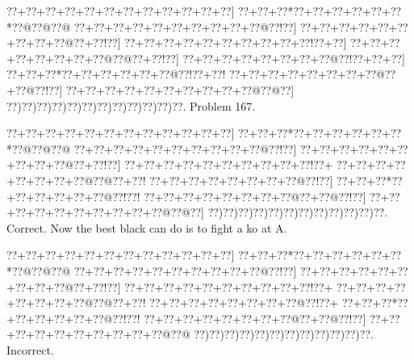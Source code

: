 \documentclass[a5paper]{article}
\begin{document}
\newpage
\begin{center}
{\goo
\0??+\0??+\0??+\0??+\0??+\0??+\0??+\0??+\0??+\0??+\0??+\0??]
\0??+\0??+\0??*\0??+\0??+\0??+\0??+\0??+\0??*\0??@\0??@\0??@
\0??+\0??+\0??+\0??+\0??+\0??+\0??+\0??+\0??+\0??@\0??!\0??]
\0??+\0??+\0??+\0??+\0??+\0??+\0??+\0??+\0??@\0??+\0??!\0??]
\0??+\0??+\0??+\0??+\0??+\0??+\0??+\0??+\0??+\0??!\0??+\0??]
\0??+\0??+\0??+\0??+\0??+\0??+\0??+\0??@\0??@\0??+\0??!\0??]
\0??+\0??+\0??+\0??+\0??+\0??+\0??+\0??@\0??!\0??+\0??+\0??]
\0??+\0??+\0??*\0??+\0??+\0??+\0??+\0??+\0??@\0??!\0??+\0??!
\0??+\0??+\0??+\0??+\0??+\0??+\0??+\0??@\0??+\0??@\0??!\0??]
\0??+\0??+\0??+\0??+\0??+\0??+\0??+\0??+\0??+\0??@\0??@\0??]
\0??)\0??)\0??)\0??)\0??)\0??)\0??)\0??)\0??)\0??)\0??)\0??.
}
Problem 167.

\end{center}
\begin{center}
{\goo
\0??+\0??+\0??+\0??+\0??+\0??+\0??+\0??+\0??+\0??+\0??+\0??]
\0??+\0??+\0??*\0??+\0??+\0??+\0??+\0??+\0??*\0??@\0??@\0??@
\0??+\0??+\0??+\0??+\0??+\0??+\0??+\0??+\0??+\0??@\0??!\0??]
\0??+\0??+\0??+\0??+\0??+\0??+\0??+\0??+\0??@\0??+\0??!\0??]
\0??+\0??+\0??+\0??+\0??+\0??+\0??+\0??+\0??+\0??!\0??+
\0??+\0??+\0??+\0??+\0??+\0??+\0??+\0??@\0??@\0??+\0??!
\0??+\0??+\0??+\0??+\0??+\0??+\0??+\0??@\0??!\0??]
\0??+\0??+\0??*\0??+\0??+\0??+\0??+\0??+\0??@\0??!\0??!
\0??+\0??+\0??+\0??+\0??+\0??+\0??+\0??@\0??+\0??@\0??!\0??]
\0??+\0??+\0??+\0??+\0??+\0??+\0??+\0??+\0??+\0??@\0??@\0??]
\0??)\0??)\0??)\0??)\0??)\0??)\0??)\0??)\0??)\0??)\0??)\0??.
}
Correct. Now the best black can do is to fight a ko at A.

\end{center}
\begin{center}
{\goo
\0??+\0??+\0??+\0??+\0??+\0??+\0??+\0??+\0??+\0??+\0??+\0??]
\0??+\0??+\0??*\0??+\0??+\0??+\0??+\0??+\0??*\0??@\0??@\0??@
\0??+\0??+\0??+\0??+\0??+\0??+\0??+\0??+\0??+\0??@\0??!\0??]
\0??+\0??+\0??+\0??+\0??+\0??+\0??+\0??+\0??@\0??+\0??!\0??]
\0??+\0??+\0??+\0??+\0??+\0??+\0??+\0??+\0??+\0??!\0??+
\0??+\0??+\0??+\0??+\0??+\0??+\0??+\0??@\0??@\0??+\0??!
\0??+\0??+\0??+\0??+\0??+\0??+\0??+\0??@\0??!\0??+
\0??+\0??+\0??*\0??+\0??+\0??+\0??+\0??+\0??@\0??!\0??!
\0??+\0??+\0??+\0??+\0??+\0??+\0??+\0??@\0??+\0??@\0??!\0??]
\0??+\0??+\0??+\0??+\0??+\0??+\0??+\0??+\0??+\0??@\0??@
\0??)\0??)\0??)\0??)\0??)\0??)\0??)\0??)\0??)\0??)\0??)\0??.
}
Incorrect. 

\end{center}
\end{document}

